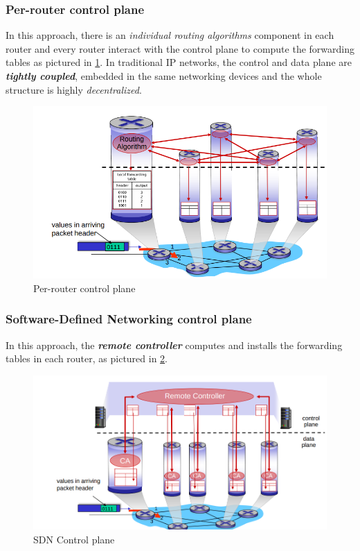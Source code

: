 \documentclass[10pt,a4paper]{report}
\theoremstyle{definition}
\begin{document}
\subsubsection{Per-router control plane}\label{sec:per-router-control-plane}
In this approach, there is an \textit{individual routing algorithms} component in each router and every router interact with the control plane to compute the forwarding tables as pictured in \ref{per-route-control-plane}.
In traditional IP networks, the control and data plane are \textit{\textbf{tightly coupled}}, embedded in the same networking devices and the whole structure is highly \textit{decentralized}. 
\begin{figure}[h]
	\centering\includegraphics[scale=0.50]{images/Pasted image 20230322105517.png}
	\caption{Per-router control plane}
\label{per-route-control-plane}
\end{figure}

\subsubsection{Software-Defined Networking control plane}\label{sec:software-defined-networking-control-plane}
In this approach, the \textit{\textbf{remote controller}} computes and installs the forwarding tables in each router, as pictured in \ref{sdn-image}.

\begin{figure}[h!]
	\centering\includegraphics[scale=0.50]{images/Pasted image 20230322105540.png}
	\caption{SDN Control plane}
\label{sdn-image}
\end{figure}
\end{document}

